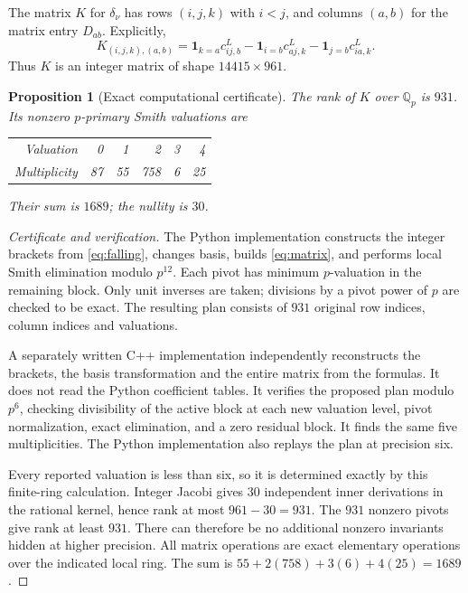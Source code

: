 \documentclass[11pt]{article}
\newtheorem{proposition}[theorem]{Proposition}
\theoremstyle{definition}\newtheorem{definition}[theorem]{Definition}
\theoremstyle{remark}\newtheorem{remark}[theorem]{Remark}
\newcommand{\Qp}{\mathbb Q_p}
\begin{document}
The matrix $K$ for $\delta_\nu$ has rows $(i,j,k)$ with $i<j$, and columns
$(a,b)$ for the matrix entry $D_{ab}$. Explicitly,
\begin{equation}\label{eq:matrix}
 K_{(i,j,k),(a,b)}
 =\mathbf1_{k=a}c^L_{ij,b}
  -\mathbf1_{i=b}c^L_{aj,k}
  -\mathbf1_{j=b}c^L_{ia,k}.
\end{equation}
Thus $K$ is an integer matrix of shape $14415\times961$.

\begin{proposition}[Exact computational certificate]\label{prop:smith}
The rank of $K$ over $\Qp$ is $931$. Its nonzero $p$-primary Smith
valuations are
\begin{center}
\begin{tabular}{rrrrrr}
\toprule Valuation & 0 & 1 & 2 & 3 & 4 \\
Multiplicity & 87 & 55 & 758 & 6 & 25 \\
\bottomrule
\end{tabular}
\end{center}
Their sum is $1689$; the nullity is $30$.
\end{proposition}
\begin{proof}[Certificate and verification]
The Python implementation constructs the integer brackets from
\eqref{eq:falling}, changes basis, builds \eqref{eq:matrix}, and performs
local Smith elimination modulo $p^{12}$. Each pivot has minimum $p$-valuation
in the remaining block. Only unit inverses are taken; divisions by a
pivot power of $p$ are checked to be exact. The resulting plan consists
of $931$ original row indices, column indices and valuations.

A separately written C++ implementation independently reconstructs the
brackets, the basis transformation and the entire matrix from the formulas.
It does not read the Python coefficient tables. It verifies the proposed
plan modulo $p^6$, checking divisibility of the active block at each new
valuation level, pivot normalization, exact elimination, and a zero residual
block. It finds the same five multiplicities. The Python implementation
also replays the plan at precision six.

Every reported valuation is less than six, so it is determined exactly by
this finite-ring calculation. Integer Jacobi gives $30$ independent inner
derivations in the rational kernel, hence rank at most $961-30=931$.
The $931$ nonzero pivots give rank at least $931$. There can therefore be
no additional nonzero invariants hidden at higher precision. All matrix
operations are exact elementary operations over the indicated local ring.
The sum is $55+2(758)+3(6)+4(25)=1689$.
\end{proof}
\end{document}
